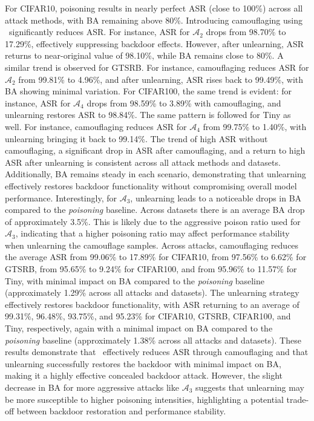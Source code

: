 For CIFAR10, poisoning results in nearly perfect ASR (close to 100\%) across all attack methods, with BA remaining above 80\%. Introducing camouflaging using \methodname~significantly reduces ASR. For instance, ASR for $\mathcal{A}_2$ drops from 98.70\% to 17.29\%, effectively suppressing backdoor effects. However, after unlearning, ASR returns to near-original value of 98.10\%, while BA remains close to 80\%. A similar trend is observed for GTSRB. For instance, camouflaging reduces ASR for $\mathcal{A}_2$ from 99.81\% to 4.96\%, and after unlearning, ASR rises back to 99.49\%, with BA showing minimal variation. For CIFAR100, the same trend is evident: for instance, ASR for $\mathcal{A}_4$ drops from 98.59\% to 3.89\% with camouflaging, and unlearning restores ASR to 98.84\%. The same pattern is followed for Tiny as well. For instance, camouflaging reduces ASR for $\mathcal{A}_4$ from 99.75\% to 1.40\%, with unlearning bringing it back to 99.14\%. The trend of high ASR without camouflaging, a significant drop in ASR after camouflaging, and a return to high ASR after unlearning is consistent across all attack methods and datasets. Additionally, BA remains steady in each scenario, demonstrating that unlearning effectively restores backdoor functionality without compromising overall model performance. Interestingly, for $\mathcal{A}_3$, unlearning leads to a noticeable drops in BA compared to the \textit{poisoning} baseline. Across datasets there is an average BA drop of approximately 3.5\%. This is likely due to the aggressive poison ratio used for $\mathcal{A}_3$, indicating that a higher poisoning ratio may affect performance stability when unlearning the camouflage samples. Across attacks, camouflaging reduces the average ASR from 99.06\% to 17.89\% for CIFAR10, from 97.56\% to 6.62\% for GTSRB, from 95.65\% to 9.24\% for CIFAR100, and from 95.96\% to 11.57\% for Tiny, with minimal impact on BA compared to the \textit{poisoning} baseline (approximately 1.29\% across all attacks and datasets). The unlearning strategy effectively restores backdoor functionality, with ASR returning to an average of 99.31\%, 96.48\%, 93.75\%, and 95.23\% for CIFAR10, GTSRB, CIFAR100, and Tiny, respectively, again with a minimal impact on BA compared to the \textit{poisoning} baseline (approximately 1.38\% across all attacks and datasets).
These results demonstrate that \methodname~effectively reduces ASR through camouflaging and that unlearning successfully restores the backdoor with minimal impact on BA, making it a highly effective concealed backdoor attack. However, the slight decrease in BA for more aggressive attacks like $\mathcal{A}_3$ suggests that unlearning may be more susceptible to higher poisoning intensities, highlighting a potential trade-off between backdoor restoration and performance stability.

